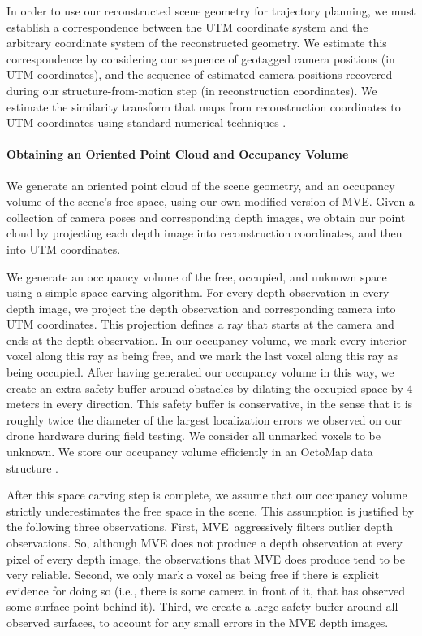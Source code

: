 In order to use our reconstructed scene geometry for trajectory planning, we must establish a correspondence between the UTM coordinate system and the arbitrary coordinate system of the reconstructed geometry.
We estimate this correspondence by considering our sequence of geotagged camera positions (in UTM coordinates), and the sequence of estimated camera positions recovered during our structure-from-motion step (in reconstruction coordinates).
We estimate the similarity transform that maps from reconstruction coordinates to UTM coordinates using standard numerical techniques \cite{sorkine:2017}.

\vspace{-12pt}
\paragraph{Obtaining an Oriented Point Cloud and Occupancy Volume}
We generate an oriented point cloud of the scene geometry, and an occupancy volume of the scene's free space, using our own modified version of MVE.
Given a collection of camera poses and corresponding depth images, we obtain our point cloud by projecting each depth image into reconstruction coordinates, and then into UTM coordinates.

We generate an occupancy volume of the free, occupied, and unknown space using a simple space carving algorithm.
For every depth observation in every depth image, we project the depth observation and corresponding camera into UTM coordinates.
This projection defines a ray that starts at the camera and ends at the depth observation.
In our occupancy volume, we mark every interior voxel along this ray as being free, and we mark the last voxel along this ray as being occupied.
After having generated our occupancy volume in this way, we create an extra safety buffer around obstacles by dilating the occupied space by 4 meters in every direction.
This safety buffer is conservative, in the sense that it is roughly twice the diameter of the largest localization errors we observed on our drone hardware during field testing.
We consider all unmarked voxels to be unknown.
We store our occupancy volume efficiently in an OctoMap data structure \cite{hornung:2013}.

After this space carving step is complete, we assume that our occupancy volume strictly underestimates the free space in the scene.
This assumption is justified by the following three observations.
First, MVE\ aggressively filters outlier depth observations. So, although MVE does not produce a depth observation at every pixel of every depth image, the observations that MVE does produce tend to be very reliable.
Second, we only mark a voxel as being free if there is explicit evidence for doing so (i.e., there is some camera in front of it, that has observed some surface point behind it).
Third, we create a large safety buffer around all observed surfaces, to account for any small errors in the MVE depth images.

